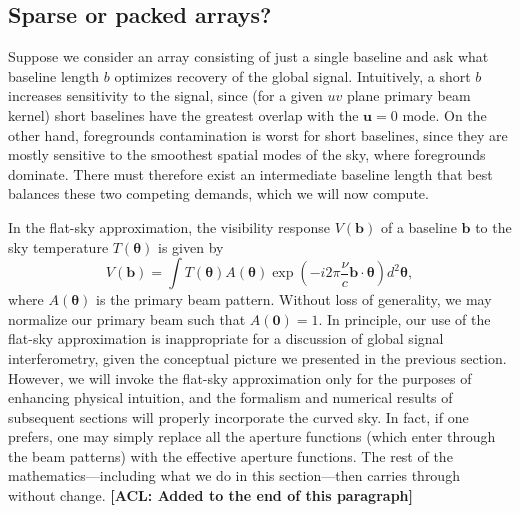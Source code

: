 \documentclass[twocolumn,apj,numberedappendix]{emulateapj}
\newcommand{\acl}[1]{{\color{red} \textbf{[ACL:  #1]}}}
\begin{document}
\subsection{Sparse or packed arrays?}

Suppose we consider an array consisting of just a single baseline and ask what baseline length $b$ optimizes recovery of the global signal.  Intuitively, a short $b$ increases sensitivity to the signal, since (for a given $uv$ plane primary beam kernel) short baselines have the greatest overlap with the $\mathbf{u}=0$ mode.  On the other hand, foregrounds contamination is worst for short baselines, since they are mostly sensitive to the smoothest spatial modes of the sky, where foregrounds dominate.  There must therefore exist an intermediate baseline length that best balances these two competing demands, which we will now compute.

In the flat-sky approximation, the visibility response $V(\mathbf{b})$ of a baseline $\mathbf{b}$ to the sky temperature $T(\boldsymbol \theta)$ is given by
\begin{equation}
\label{eq:Vb}
V(\mathbf{b}) = \int  T(\boldsymbol \theta) A(\boldsymbol \theta) \exp \left( -i 2 \pi \frac{\nu}{c} \mathbf{b} \cdot \boldsymbol \theta \right) d^2 \mathbf{\theta},
\end{equation}
where $ A(\boldsymbol \theta)$ is the primary beam pattern. Without loss of generality, we may normalize our primary beam such that $A(\mathbf{0}) = 1$. In principle, our use
of the flat-sky approximation is inappropriate for a discussion of global signal interferometry,
given the conceptual picture we presented in the previous section. However, we will
invoke the flat-sky approximation only for the purposes of enhancing physical intuition, and
the formalism and numerical results of subsequent sections will properly incorporate the
curved sky. In fact, if one prefers, one may simply replace all the aperture functions
(which enter through the beam patterns) with the effective aperture functions. The
rest of the mathematics---including what we do in this section---then carries through without change.\acl{Added to the end of this paragraph}
\end{document}
